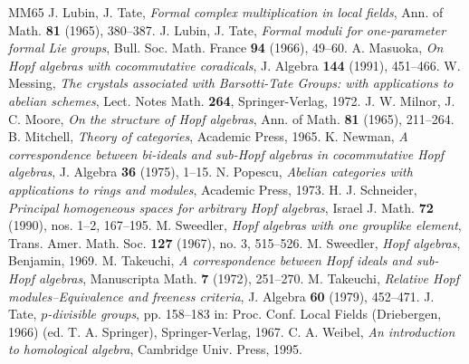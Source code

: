 \begin{thebibliography}{MM65}
 J. Lubin, J. Tate, \textit{Formal complex multiplication in local fields}, Ann. of Math. \textbf{81} (1965), 380--387.
 J. Lubin, J. Tate, \textit{Formal moduli for one-parameter formal Lie groups}, Bull. Soc. Math. France \textbf{94} (1966), 49--60.
 A. Masuoka, \textit{On Hopf algebras with cocommutative coradicals}, J. Algebra \textbf{144} (1991), 451--466.
 W. Messing, \textit{The crystals associated with Barsotti-Tate Groups: with applications to abelian schemes}, Lect. Notes Math. \textbf{264}, Springer-Verlag, 1972.
 J. W. Milnor, J. C. Moore, \textit{On the structure of Hopf algebras}, Ann. of Math. \textbf{81} (1965), 211--264.
 B. Mitchell, \textit{Theory of categories}, Academic Press, 1965.
 K. Newman, \textit{A correspondence between bi-ideals and sub-Hopf algebras in cocommutative Hopf algebras}, J. Algebra \textbf{36} (1975), 1--15.
 N. Popescu, \textit{Abelian categories with applications to rings and modules}, Academic Press, 1973.
 H. J. Schneider, \textit{Principal homogeneous spaces for arbitrary Hopf algebras}, Israel J. Math. \textbf{72} (1990), nos. 1--2, 167--195.
 M. Sweedler, \textit{Hopf algebras with one grouplike element}, Trans. Amer. Math. Soc. \textbf{127} (1967), no. 3, 515--526.
 M. Sweedler, \textit{Hopf algebras}, Benjamin, 1969.
 M. Takeuchi, \textit{A correspondence between Hopf ideals and sub-Hopf algebras}, Manuscripta Math. \textbf{7} (1972), 251--270.
 M. Takeuchi, \textit{Relative Hopf modules--Equivalence and freeness criteria}, J. Algebra \textbf{60} (1979), 452--471.
 J. Tate, \textit{$p$-divisible groups}, pp. 158--183 in: Proc. Conf. Local Fields (Driebergen, 1966) (ed. T. A. Springer), Springer-Verlag, 1967.
 C. A. Weibel, \textit{An introduction to homological algebra}, Cambridge Univ. Press, 1995.
\end{thebibliography}
